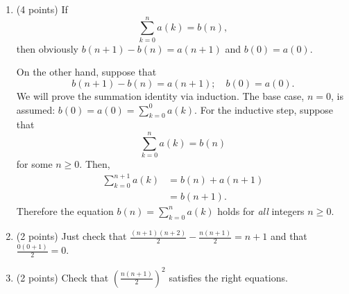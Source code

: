 \documentclass[12pt]{rudin}
\begin{document}
\begin{Answer}
    \begin{enumerate}[label=(\textbf{\alph*})]
	    \item (4 points) If
            \begin{equation*}
                \sum_{k = 0}^n a(k) = b(n),
            \end{equation*}
	    then obviously $b(n + 1) - b(n) = a(n + 1)$ and $b(0) = a(0)$.

	    On the other hand, suppose that
            \begin{equation*}
                b(n + 1) - b(n) = a(n + 1); \quad b(0) = a(0).
            \end{equation*}
	    We will prove the summation identity via induction. The
	    base case, $n = 0$, is assumed: $b(0) = a(0) = \sum_{k = 0}^0
	    a(k)$. For the inductive step, suppose that
            \begin{equation*}
                \sum_{k = 0}^n a(k) = b(n)
            \end{equation*}
	    for some $n \geq 0$. Then,
            \begin{align*}
		    \sum_{k = 0}^{n + 1} a(k) &= b(n) + a(n + 1) \\
		    			      &= b(n + 1).
            \end{align*}
	    Therefore the equation $b(n) = \sum_{k = 0}^n a(k)$ holds
	    for \emph{all} integers $n \geq 0$.

    \item (2 points) Just check that $\frac{(n + 1)(n + 2)}{2} - \frac{n(n + 1)}{2} = n + 1$ and that $\frac{0(0 + 1)}{2} = 0$.

    \item (2 points) Check that $\left( \frac{n(n + 1)}{2} \right)^2$ satisfies the right
	    equations.
    \end{enumerate}
\end{Answer}
\end{document}
